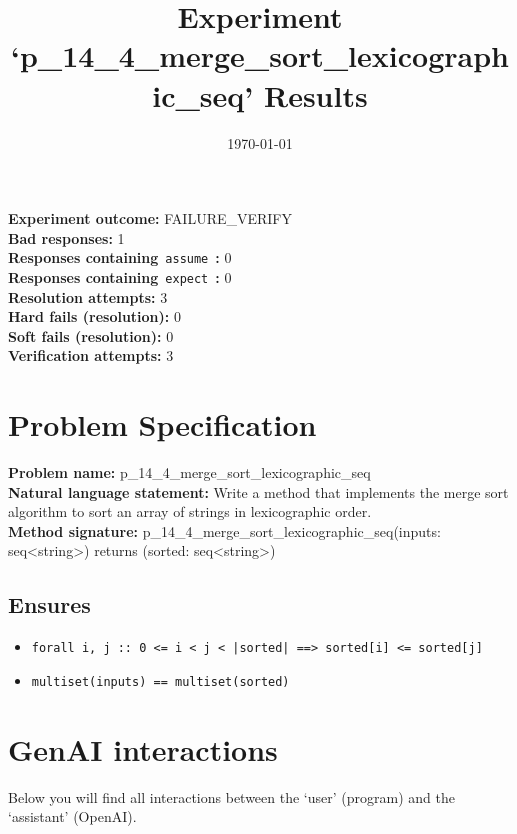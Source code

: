 \documentclass{article}
\begin{document}
\title{Experiment `p\_14\_4\_merge\_sort\_lexicographic\_seq' Results}
\author{\today}
\date{}
\maketitle
\textbf{Experiment outcome: }FAILURE\_VERIFY
\\\textbf{Bad responses: }1
\\\textbf{Responses containing}~\texttt{assume}~\textbf{: }0
\\\textbf{Responses containing}~\texttt{expect}~\textbf{: }0
\\\textbf{Resolution attempts: }3
\\\textbf{Hard fails (resolution): }0
\\\textbf{Soft fails (resolution): }0
\\\textbf{Verification attempts: }3
\section*{Problem Specification}
\textbf{Problem name: }p\_14\_4\_merge\_sort\_lexicographic\_seq
\\\textbf{Natural language statement: }Write a method that implements the merge sort algorithm to sort an array of strings in lexicographic order.
\\\textbf{Method signature: }p\_14\_4\_merge\_sort\_lexicographic\_seq(inputs: seq<string>) returns (sorted: seq<string>)
\subsection*{Ensures}
\begin{itemize}
\item \texttt{forall i, j :: 0 <= i < j < |sorted| ==> sorted[i] <= sorted[j]}
\item \texttt{multiset(inputs) == multiset(sorted)}
\end{itemize}
\clearpage
\section*{GenAI interactions}
Below you will find all interactions between the `user' (program) and the `assistant' (OpenAI).
\end{document}
